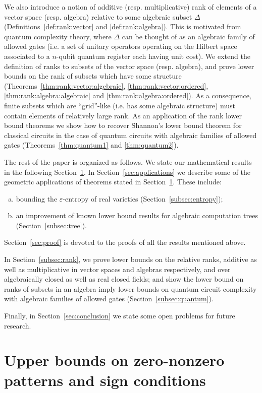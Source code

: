 \documentclass[10pt]{amsart}
\theoremstyle{definition}
\theoremstyle{remark}
\numberwithin{equation}{section}
\newcommand {\eps} {{\varepsilon}}
\begin{document}
We also introduce a notion of additive (resp. multiplicative) rank of elements of a vector space (resp. algebra) relative to some algebraic 
subset $\Delta$ (Definitions~\ref{def:rank:vector} and \ref{def:rank:algebra}). 
This is motivated from quantum complexity theory, where 
$\Delta$ can be thought of as an 
algebraic family of allowed gates
(i.e. a set of unitary operators operating on the Hilbert space associated to a 
$n$-qubit quantum register each having unit cost). We extend the definition of ranks to subsets of the vector space (resp. algebra), and prove lower bounds on the rank of subsets which have some structure
(Theorems~\ref{thm:rank:vector:algebraic}, \ref{thm:rank:vector:ordered},  \ref{thm:rank:algebra:algebraic} and \ref{thm:rank:algebra:ordered}).
As a consequence, finite subsets which are ``grid''-like (i.e. has some algebraic structure) must contain elements of relatively large rank. 
As an application of the rank lower bound theorems  we show how to recover Shannon's lower bound theorem for classical circuits in the case of quantum circuits 
with algebraic families of allowed gates
(Theorems~\ref{thm:quantum1} and \ref{thm:quantum2}). 


The rest of the paper is organized as follows. We state our mathematical results in the following Section~\ref{sec:main}. In Section~\ref{sec:applications}
we describe some of the geometric applications of theorems stated in Section~\ref{sec:main}.
These include:
\begin{enumerate}[(a)]
\item bounding the $\eps$-entropy of real varieties (Section~\ref{subsec:entropy}); 
\item an improvement of known lower bound results for algebraic computation trees (Section~\ref{subsec:tree}).
\end{enumerate}
Section~\ref{sec:proof} is devoted to the proofs of all the results mentioned above.

In Section~\ref{subsec:rank}, we prove 
lower bounds on the relative ranks, additive as well as multiplicative 
in vector spaces and algebras respectively, 
and over algebraically closed as well as real closed fields;
and show the lower bound on ranks of subsets in an algebra imply
lower bounds on quantum circuit complexity with 
algebraic families of allowed gates
(Section~\ref{subsec:quantum}).

Finally, in Section~\ref{sec:conclusion} we state some open problems for future research.


\section{Upper bounds on zero-nonzero patterns and sign conditions}
\label{sec:main}
\end{document}

